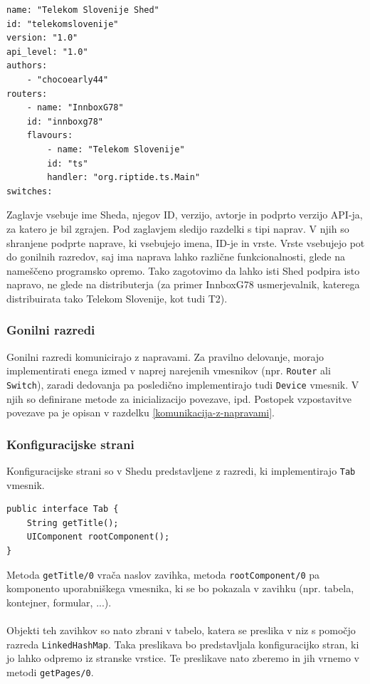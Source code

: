 \documentclass[12pt]{article}
\begin{document}
\begin{lstlisting}[style=XmlStyle]
name: "Telekom Slovenije Shed"
id: "telekomslovenije"
version: "1.0"
api_level: "1.0"
authors:
	- "chocoearly44"
routers:
	- name: "InnboxG78"
	id: "innboxg78"
	flavours:
		- name: "Telekom Slovenije"
		id: "ts"
		handler: "org.riptide.ts.Main"
switches:
\end{lstlisting}
Zaglavje vsebuje ime Sheda, njegov ID, verzijo, avtorje in podprto verzijo
API-ja, za katero je bil zgrajen. Pod zaglavjem sledijo razdelki s tipi
naprav. V njih so shranjene podprte naprave, ki vsebujejo imena, ID-je in
vrste. Vrste vsebujejo pot do gonilnih razredov, saj ima naprava lahko
različne funkcionalnosti, glede na nameščeno programsko opremo. Tako
zagotovimo da lahko isti Shed podpira isto napravo, ne glede na
distributerja (za primer InnboxG78 usmerjevalnik, katerega distribuirata
tako Telekom Slovenije, kot tudi T2).

\subsubsection{Gonilni razredi}
Gonilni razredi komunicirajo z napravami. Za pravilno delovanje, morajo
implementirati enega izmed v naprej narejenih vmesnikov (npr.
\texttt{Router} ali \texttt{Switch}), zaradi dedovanja pa posledično
implementirajo tudi \texttt{Device} vmesnik. V njih so definirane metode
za inicializacijo povezave, ipd. Postopek vzpostavitve povezave pa je
opisan v razdelku \ref{komunikacija-z-napravami}.

\subsubsection{Konfiguracijske strani} \label{konfiguracijske-strani}
Konfiguracijske strani so v Shedu predstavljene z razredi, ki
implementirajo \texttt{Tab} vmesnik.

\begin{lstlisting}[style=JavaStyle]
public interface Tab {
	String getTitle();
	UIComponent rootComponent();
}
\end{lstlisting}
Metoda \texttt{getTitle/0} vrača naslov zavihka, metoda
\texttt{rootComponent/0} pa komponento uporabniškega vmesnika, ki se bo
pokazala v zavihku (npr. tabela, kontejner, formular, ...).
\\\\
Objekti teh zavihkov so nato zbrani v tabelo, katera se preslika v niz s
pomočjo razreda \texttt{LinkedHashMap}. Taka preslikava bo predstavljala
konfiguracijko stran, ki jo lahko odpremo iz stranske vrstice. Te
preslikave nato zberemo in jih vrnemo v metodi \texttt{getPages/0}.
\end{document}
